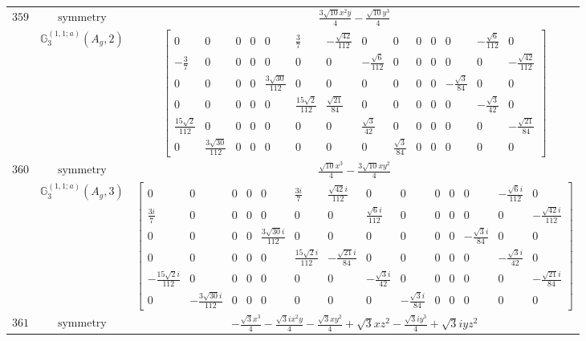 \documentclass[fleqn,8pt,landscape]{jsarticle}
\begin{document}
\begin{longtable}{ccc}
$ 359 $ & $ \text{symmetry} $ & $ \frac{3 \sqrt{10} x^{2} y}{4} - \frac{\sqrt{10} y^{3}}{4} $ \\
$  $ & $ \mathbb{G}_{3}^{(1,1;a)}(A_{g},2) $ & $ \begin{bmatrix} 0 & 0 & 0 & 0 & 0 & \frac{3}{7} & - \frac{\sqrt{42}}{112} & 0 & 0 & 0 & 0 & 0 & - \frac{\sqrt{6}}{112} & 0 \\ - \frac{3}{7} & 0 & 0 & 0 & 0 & 0 & 0 & - \frac{\sqrt{6}}{112} & 0 & 0 & 0 & 0 & 0 & - \frac{\sqrt{42}}{112} \\ 0 & 0 & 0 & 0 & \frac{3 \sqrt{30}}{112} & 0 & 0 & 0 & 0 & 0 & 0 & - \frac{\sqrt{3}}{84} & 0 & 0 \\ 0 & 0 & 0 & 0 & 0 & \frac{15 \sqrt{2}}{112} & \frac{\sqrt{21}}{84} & 0 & 0 & 0 & 0 & 0 & - \frac{\sqrt{3}}{42} & 0 \\ \frac{15 \sqrt{2}}{112} & 0 & 0 & 0 & 0 & 0 & 0 & \frac{\sqrt{3}}{42} & 0 & 0 & 0 & 0 & 0 & - \frac{\sqrt{21}}{84} \\ 0 & \frac{3 \sqrt{30}}{112} & 0 & 0 & 0 & 0 & 0 & 0 & \frac{\sqrt{3}}{84} & 0 & 0 & 0 & 0 & 0 \end{bmatrix} $ \\ \hline
$ 360 $ & $ \text{symmetry} $ & $ \frac{\sqrt{10} x^{3}}{4} - \frac{3 \sqrt{10} x y^{2}}{4} $ \\
$  $ & $ \mathbb{G}_{3}^{(1,1;a)}(A_{g},3) $ & $ \begin{bmatrix} 0 & 0 & 0 & 0 & 0 & \frac{3 i}{7} & \frac{\sqrt{42} i}{112} & 0 & 0 & 0 & 0 & 0 & - \frac{\sqrt{6} i}{112} & 0 \\ \frac{3 i}{7} & 0 & 0 & 0 & 0 & 0 & 0 & \frac{\sqrt{6} i}{112} & 0 & 0 & 0 & 0 & 0 & - \frac{\sqrt{42} i}{112} \\ 0 & 0 & 0 & 0 & \frac{3 \sqrt{30} i}{112} & 0 & 0 & 0 & 0 & 0 & 0 & - \frac{\sqrt{3} i}{84} & 0 & 0 \\ 0 & 0 & 0 & 0 & 0 & \frac{15 \sqrt{2} i}{112} & - \frac{\sqrt{21} i}{84} & 0 & 0 & 0 & 0 & 0 & - \frac{\sqrt{3} i}{42} & 0 \\ - \frac{15 \sqrt{2} i}{112} & 0 & 0 & 0 & 0 & 0 & 0 & - \frac{\sqrt{3} i}{42} & 0 & 0 & 0 & 0 & 0 & - \frac{\sqrt{21} i}{84} \\ 0 & - \frac{3 \sqrt{30} i}{112} & 0 & 0 & 0 & 0 & 0 & 0 & - \frac{\sqrt{3} i}{84} & 0 & 0 & 0 & 0 & 0 \end{bmatrix} $ \\ \hline
$ 361 $ & $ \text{symmetry} $ & $ - \frac{\sqrt{3} x^{3}}{4} - \frac{\sqrt{3} i x^{2} y}{4} - \frac{\sqrt{3} x y^{2}}{4} + \sqrt{3} x z^{2} - \frac{\sqrt{3} i y^{3}}{4} + \sqrt{3} i y z^{2} $ \\

\end{longtable}
\end{document}
